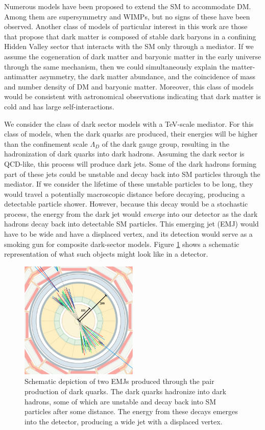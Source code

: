 Numerous models have been proposed to extend the SM to accommodate DM. Among them are supersymmetry and WIMPs, but no signs of these have been observed. Another class of models of particular interest in this work are those that propose that dark matter is composed of stable dark baryons in a confining Hidden Valley sector that interacts with the SM only through a mediator. If we assume the cogeneration of dark matter and baryonic matter in the early universe through the same mechanism, then we could simultaneously explain the matter-antimatter asymmetry, the dark matter abundance, and the coincidence of mass and number density of DM and baryonic matter. Moreover, this class of models would be consistent with astronomical observations indicating that dark matter is cold and has large self-interactions.

We consider the class of dark sector models with a TeV-scale mediator. For this class of models, when the dark quarks are produced, their energies will be higher than the confinement scale $\Lambda_D$ of the dark gauge group, resulting in the hadronization of dark quarks into dark hadrons. Assuming the dark sector is QCD-like, this process will produce dark jets. Some of the dark hadrons forming part of these jets could be unstable and decay back into SM particles through the mediator. If we consider the lifetime of these unstable particles to be long, they would travel a potentially macroscopic distance before decaying, producing a detectable particle shower. However, because this decay would be a stochastic process, the energy from the dark jet would \textit{emerge} into our detector as the dark hadrons decay back into detectable SM particles. This emerging jet (EMJ) would have to be wide and have a displaced vertex, and its detection would serve as a smoking gun for composite dark-sector models. Figure \ref{fig:emj} shows a schematic representation of what such objects might look like in a detector.

\begin{figure}[ht]
	\centering
	\includegraphics[width=0.5\textwidth]{images/emj.png}
	\caption{Schematic depiction of two EMJs produced through the pair production of dark quarks. The dark quarks hadronize into dark hadrons, some of which are unstable and decay back into SM particles after some distance. The energy from these decays emerges into the detector, producing a wide jet with a displaced vertex.}
	\label{fig:emj}
\end{figure}


